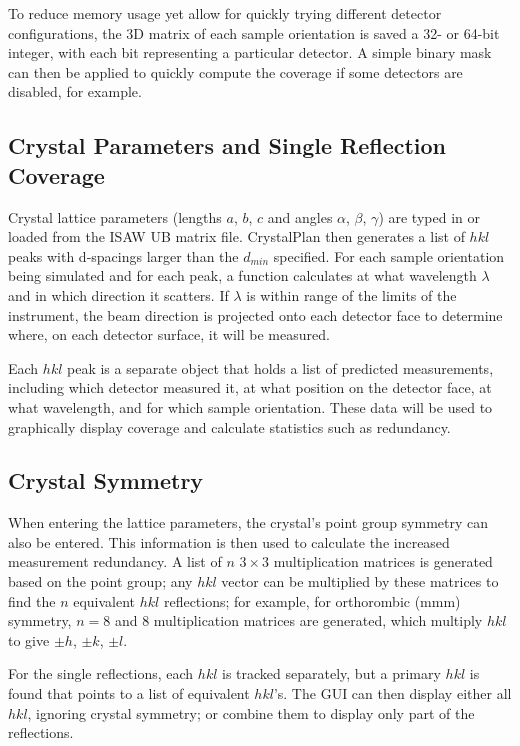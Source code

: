 \documentclass[draft]{iucr}              %
\begin{document}
To reduce memory usage yet allow for quickly trying different detector
configurations, the 3D matrix of each sample orientation is saved a 32- or
64-bit integer, with each bit representing a particular detector. A simple
binary mask can then be applied to quickly compute the coverage if some
detectors are disabled, for example.          




\subsection{Crystal Parameters and Single Reflection Coverage}

Crystal lattice parameters (lengths $a$, $b$, $c$ and angles $\alpha$, $\beta$,
$\gamma$) are typed in or loaded from the ISAW UB matrix file. CrystalPlan then
generates a list of $hkl$ peaks with d-spacings larger than the $d_{min}$
specified. For each sample orientation being simulated and for each peak, a function calculates at
what wavelength $\lambda$ and in which direction it scatters. If $\lambda$ 
is within range of the limits of the instrument, the beam direction is projected
onto each detector face to determine where, on each detector surface, it will be
measured. 
 
Each $hkl$ peak is a separate object that holds a list of predicted
measurements, including which detector measured it, at what position on the
detector face, at what wavelength, and for which sample orientation. These data
will be used to  graphically display coverage and calculate statistics such as
redundancy. 



\subsection{Crystal Symmetry}

When entering the lattice parameters, the crystal's point group symmetry can
also be entered. This information is then used to calculate the increased
measurement redundancy. A list of $n$ $3\times3$ multiplication matrices is
generated based on the point group; any $hkl$ vector can be multiplied by
these matrices to find the $n$ equivalent $hkl$ reflections; for example, for
orthorombic (mmm) symmetry, $n=8$ and 8 multiplication matrices are generated, which multiply
$hkl$ to give $\pm h$, $\pm k$, $\pm l$.              

For the single reflections, each $hkl$ is tracked separately, but a primary
$hkl$ is found that points to a list of equivalent $hkl$'s. The GUI can then display
either all $hkl$, ignoring crystal symmetry; or combine them to display only part of
the reflections.             
\end{document}
